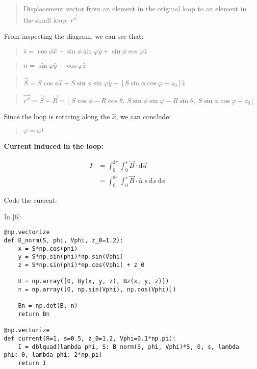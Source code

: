 \documentclass[11pt]{article}
\newif\ifcode
\newif\ifleftmargins
\newlength{\promptlength}
\newcommand{\prompt}[3]{
        \needspace{1.1cm}
        \settowidth{\promptlength}{ #1 [#3] }
        \ifleftmargins\hspace{-\promptlength}\hspace{-5pt}\fi
        {\color{#2}#1 [#3]:}
        \ifleftmargins\vspace{-2.7ex}\fi
    }
\begin{document}
\begin{quote}
Displacement vector from an element in the original loop to an element
in the small loop: \(\vec{r''}\)
\end{quote}

From inspecting the diagram, we can see that:

\begin{quote}
\(\hat{s} = \cos{\phi}\hat{x} + \sin{\phi}\sin{\varphi} \hat{y} + \sin{\phi}\cos{\varphi} \hat{z}\)
\end{quote}

\begin{quote}
\(\hat{n} = \sin{\varphi}\hat{y} + \cos{\varphi}\hat{z}\)
\end{quote}

\begin{quote}
\(\vec{S} = S\cos{\phi}\hat{x} + S\sin{\phi}\sin{\varphi} \hat{y} + [S\sin{\phi}\cos{\varphi} + z_0] \hat{z}\)
\end{quote}

\begin{quote}
\(\vec{r''} = \vec{S} - \vec{R} = [S\cos{\phi} - R\cos{\theta}, \ S\sin{\phi}\sin{\varphi} - R\sin{\theta},\ S\sin{\phi}\cos{\varphi} + z_0]\)
\end{quote}

Since the loop is rotating along the \(\hat{x}\), we can conclude:

\begin{quote}
\(\varphi = \omega t\)
\end{quote}

    \textbf{Current induced in the loop:}

\begin{align}
I &= \int_0^{2\pi} \int_0^s \vec{B} \cdot \text{d} \vec{a} \\
  &= \int_0^{2\pi} \int_0^s \vec{B} \cdot \hat{n} \ s \ \text{d}s \ \text{d} \phi
\end{align}

    Code the current:

    
\prompt{In}{incolor}{6}
\codetrue
\begin{tcolorbox}[breakable, size=fbox, boxrule=1pt, pad at break*=1mm, colback=cellbackground, colframe=cellborder]
\begin{verbatim}
@np.vectorize
def B_norm(S, phi, Vphi, z_0=1.2):
    x = S*np.cos(phi)
    y = S*np.sin(phi)*np.sin(Vphi)
    z = S*np.sin(phi)*np.cos(Vphi) + z_0
    
    B = np.array([0, By(x, y, z), Bz(x, y, z)])
    n = np.array([0, np.sin(Vphi), np.cos(Vphi)])
    
    Bn = np.dot(B, n)
    return Bn

@np.vectorize
def current(R=1, s=0.5, z_0=1.2, Vphi=0.1*np.pi):
    I = dblquad(lambda phi, S: B_norm(S, phi, Vphi)*S, 0, s, lambda phi: 0, lambda phi: 2*np.pi)
    return I
\end{verbatim}
\end{tcolorbox}
\codefalse
\end{document}
